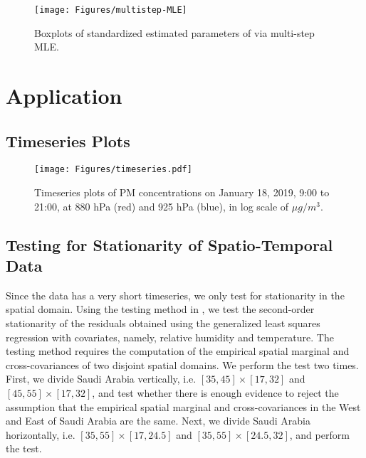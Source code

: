 \documentclass[12pt]{article}
\newcommand{\0}{\mathbf{0}}
\begin{document}
\begin{figure}[h]
 \centering
	\texttt{[image: Figures/multistep-MLE]}
	\caption{Boxplots of standardized estimated parameters of via multi-step MLE.}
    \label{fig:param-est}
\end{figure}


\section{Application}

\subsection{Timeseries Plots}

\begin{figure}[h]
 \centering
	\texttt{[image: Figures/timeseries.pdf]}
	\caption{Timeseries plots of PM concentrations on January 18, 2019, 9:00 to 21:00, at 880 hPa (red) and 925 hPa (blue), in log scale of $\mu g / m^3$.}
    \label{fig:timeseries_plots}
\end{figure}

\subsection{Testing for Stationarity of Spatio-Temporal Data}

Since the data has a very short timeseries, we only test for stationarity in the spatial domain. Using the testing method in \cite{jun2012test}, we test the second-order stationarity of the residuals obtained using the generalized least squares regression with covariates, namely, relative humidity and temperature. The testing method requires the computation of the empirical spatial marginal and cross-covariances of two disjoint spatial domains. We perform the test two times. First, we divide Saudi Arabia vertically, i.e. $[35, 45] \times [17, 32]$ and $[45, 55] \times [17, 32]$, and test whether there is enough evidence to reject the assumption that the empirical spatial marginal and cross-covariances in the West and East of Saudi Arabia are the same. Next, we divide Saudi Arabia horizontally, i.e. $[35, 55] \times [17, 24.5]$ and $[35, 55] \times [24.5, 32]$, and perform the test. 
\end{document}
